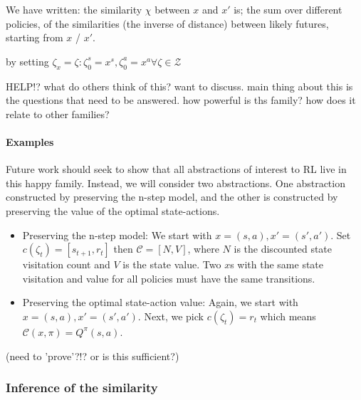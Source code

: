We have written: the similarity $\chi$ between $x$ and $x'$ is; the sum over different policies, of the
similarities (the inverse of distance) between likely futures, starting from $x$ / $x'$.

 by setting $\zeta_x = {\zeta: \zeta_0^s = x^s, \zeta_0^a = x^a \forall \zeta \in \mathcal Z}$

{\color{red}HELP!? what do others think of this? want to discuss.
main thing about this is the questions that need to be answered. how powerful is ths family?
how does it relate to other families?}


\paragraph{Examples}

Future work should seek to show that all abstractions of interest to RL live in this happy family.
Instead, we will consider two abstractions. One abstraction constructed by preserving the n-step model,
and the other is constructed by preserving the value of the optimal state-actions.

\begin{itemize}
  \tightlist
  \item Preserving the n-step model: We start with $x=(s, a), x'=(s', a')$. Set $c(\zeta_{t}) = [s_{t+1}, r_{t}]$ then $\mathcal C=[N, V]$, where $N$ is the discounted state visitation count \footnotemark[27] and $V$ is the state value. Two $x$s with the same state visitation and value for all policies must have the same transitions.
  \item Preserving the optimal state-action value: Again, we start with $x=(s, a), x'=(s', a')$. Next, we pick $c(\zeta_{t}) = r_{t}$ which means $\mathcal C(x, \pi) = Q^{\pi}(s, a)$.
\end{itemize}
{\color{red}(need to 'prove'?!? or is this sufficient?)}


\subsubsection{Inference of the similarity}\label{infer-similarity}

